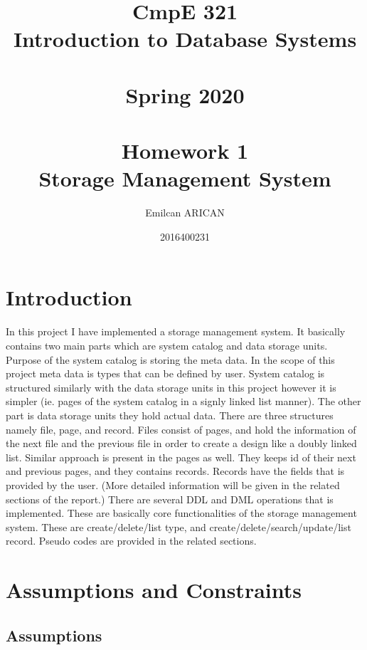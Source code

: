 \documentclass{article}
\title{ \Huge
CmpE 321\\
Introduction to Database Systems\\
\null \\
Spring 2020\\
\null \\
Homework 1 \\
\textbf{Storage Management System} \\
\null
}
\author{\Large Emilcan ARICAN}
\date{\Large 2016400231}
\begin{document}
\maketitle
\newpage

\tableofcontents
\newpage
\textbf{}
\bigskip
\section{Introduction}

In this project I have implemented a storage management system. It basically contains two main parts which are system catalog and data storage units. Purpose of the system catalog is storing the meta data. In the scope of this project meta data is types that can be defined by user. System catalog is structured similarly with the data storage units in this project however it is simpler (ie. pages of the system catalog in a signly linked list manner). The other part is data storage units they hold actual data. There are three structures namely file, page, and record. Files consist of pages, and hold the information of the next file and the previous file in order to create a design like a doubly linked list. Similar approach is present in the pages as well. They keeps id of their next and previous pages, and they contains records. Records have the fields that is provided by the user. (More detailed information will be given in the related sections of the report.) There are several DDL and DML operations that is implemented. These are basically core functionalities of the storage management system. These are create/delete/list type, and create/delete/search/update/list record.  Pseudo codes are provided in the related sections.

\newpage
\section{Assumptions and Constraints}

\subsection{Assumptions}
\end{document}
